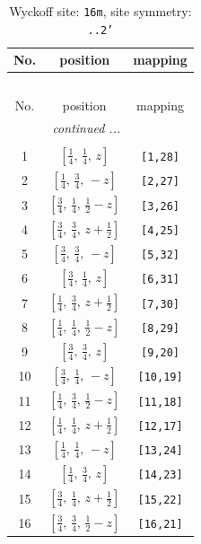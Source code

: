 \documentclass[fleqn,8pt]{jsarticle}
\begin{document}
\begin{longtable}{ccc}
\caption{Wyckoff site: {\tt 16m}, site symmetry: {\tt ..2'}}
 \\
 \hline \hline
No. & position & mapping \\ \hline \endfirsthead

\multicolumn{2}{l}{\tablename\ \thetable{}} \\
 \hline \hline
No. & position & mapping \\ \hline \endhead

 \hline \hline
\multicolumn{2}{r}{\footnotesize\it continued ...} \\ \endfoot

 \hline \hline
\multicolumn{2}{r}{} \\ \endlastfoot

1 & $\left[ \frac{1}{4},\, \frac{1}{4},\, z \right]$ & {\tt [1,28]} \\ \hline
2 & $\left[ \frac{1}{4},\, \frac{3}{4},\, - z \right]$ & {\tt [2,27]} \\ \hline
3 & $\left[ \frac{3}{4},\, \frac{1}{4},\, \frac{1}{2} - z \right]$ & {\tt [3,26]} \\ \hline
4 & $\left[ \frac{3}{4},\, \frac{3}{4},\, z + \frac{1}{2} \right]$ & {\tt [4,25]} \\ \hline
5 & $\left[ \frac{3}{4},\, \frac{3}{4},\, - z \right]$ & {\tt [5,32]} \\ \hline
6 & $\left[ \frac{3}{4},\, \frac{1}{4},\, z \right]$ & {\tt [6,31]} \\ \hline
7 & $\left[ \frac{1}{4},\, \frac{3}{4},\, z + \frac{1}{2} \right]$ & {\tt [7,30]} \\ \hline
8 & $\left[ \frac{1}{4},\, \frac{1}{4},\, \frac{1}{2} - z \right]$ & {\tt [8,29]} \\ \hline
9 & $\left[ \frac{3}{4},\, \frac{3}{4},\, z \right]$ & {\tt [9,20]} \\ \hline
10 & $\left[ \frac{3}{4},\, \frac{1}{4},\, - z \right]$ & {\tt [10,19]} \\ \hline
11 & $\left[ \frac{1}{4},\, \frac{3}{4},\, \frac{1}{2} - z \right]$ & {\tt [11,18]} \\ \hline
12 & $\left[ \frac{1}{4},\, \frac{1}{4},\, z + \frac{1}{2} \right]$ & {\tt [12,17]} \\ \hline
13 & $\left[ \frac{1}{4},\, \frac{1}{4},\, - z \right]$ & {\tt [13,24]} \\ \hline
14 & $\left[ \frac{1}{4},\, \frac{3}{4},\, z \right]$ & {\tt [14,23]} \\ \hline
15 & $\left[ \frac{3}{4},\, \frac{1}{4},\, z + \frac{1}{2} \right]$ & {\tt [15,22]} \\ \hline
16 & $\left[ \frac{3}{4},\, \frac{3}{4},\, \frac{1}{2} - z \right]$ & {\tt [16,21]} \\
\end{longtable}
\end{document}
